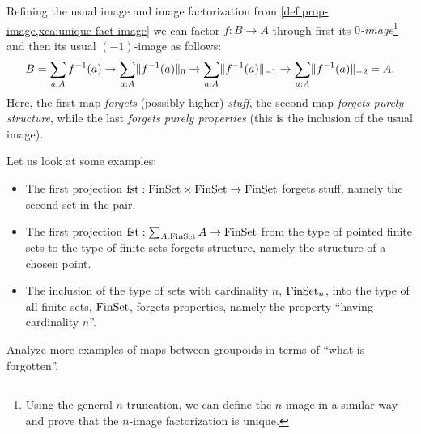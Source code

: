 Refining the usual image and image factorization from
\cref{def:prop-image,xca:unique-fact-image}
we can factor $f : B \to A$ through
first its \emph{$0$-image}\footnote{%
  Using the general $n$-truncation,
  we can define the $n$-image
  in a similar way and prove that
  the $n$-image factorization is unique.}
and then its usual $(-1)$-image as follows:
\[
  B = \sum_{a:A} f^{-1}(a) \to
  \sum_{a:A} \lVert f^{-1}(a)\rVert_0 \to
  \sum_{a:A} \lVert f^{-1}(a)\rVert_{-1} \to
  \sum_{a:A} \lVert f^{-1}(a)\rVert_{-2} = A.
\]
Here, the first map \emph{forgets} (possibly higher) \emph{stuff},
the second map \emph{forgets purely structure},
while the last \emph{forgets purely properties}
(this is the inclusion of the usual image).

\begin{example}\label{exa:stuff-struct-prop}
  Let us look at some examples:
  \begin{itemize}
  \item The first projection $\fst : \FinSet \times \FinSet \to \FinSet$
    forgets stuff, namely the second set in the pair.
  \item The first projection $\fst : \sum_{A:\FinSet} A \to \FinSet$
    from the type of pointed finite sets to the type of finite sets
    forgets structure, namely the structure of a chosen point.
  \item The inclusion of the type of sets with cardinality
    $n$, $\mathrm{FinSet}_n$, into the type of all finite sets, $\mathrm{FinSet}$,
    forgets properties, namely the property
    ``having cardinality $n$''.\qedhere
    \end{itemize}
\end{example}
\begin{xca}\label{xca:stuff-struct-prop}
  Analyze more examples of maps between groupoids
  in terms of ``what is forgotten''.
\end{xca}

